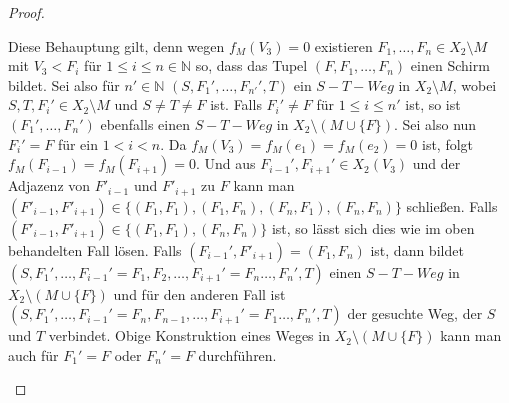 \documentclass[12pt,titlepage]{article}
\begin{document}
\begin{proof}
\begin{itemize}
 Diese Behauptung gilt, denn wegen $f_M(V_3)=0$ existieren $F_1,\ldots,F_n \in X_2\setminus M$ mit $V_3 <F_i$ für $1 \leq i \leq n \in \mathbb{N}$ so, dass das Tupel $(F,F_1,\ldots,F_n)$ einen Schirm bildet.
  Sei also für $n' \in \mathbb{N}$
   $(S,F_1',\ldots ,F_{n'}',T)$ ein $S-T-Weg$ in $X_2 \setminus M$, wobei $S,T,F_i' \in X_2\setminus M$ und $S\neq T \neq F$ ist. 
  Falls $F_i' \neq F$ für $1 \leq i \leq n'$ ist, so ist $(F_1',\ldots,F_n')$ ebenfalls einen $S-T-Weg$ in $X_2\setminus (M \cup \{F\})$.
   Sei also nun $F_i'=F$ für ein $1 < i < n$. Da $f_M(V_3)=f_M(e_1)=f_M(e_2)=0$ ist, folgt $f_M(F_{i-1})=f_M(F_{i+1})=0$. Und aus $F_{i-1}',F_{i+1}' \in X_2(V_3)$ und der Adjazenz von $F'_{i-1}$ und $F'_{i+1}$ zu $F$ kann man $(F'_{i-1},F'_{i+1}) \in \{(F_1,F_1),(F_1,F_n),(F_n,F_1),(F_n,F_n)\}$ schließen. Falls $(F'_{i-1},F'_{i+1}) \in \{(F_1,F_1),(F_n,F_n)\}$ ist, so lässt sich dies wie im oben behandelten Fall lösen. Falls $(F_{i-1}',F'_{i+1})=(F_1,F_n)$ ist, dann bildet $(S,F_1',\ldots,F_{i-1}'=F_1,F_2, \ldots,F_{i+1}'=F_n\ldots,F_n',T)$ einen $S-T-Weg$ in $X_2\setminus (M \cup \{F\})$ und für den anderen Fall ist $(S,F_1',\ldots,F_{i-1}'=F_n,F_{n-1}, \ldots,F_{i+1}'=F_1\ldots,F_n',T)$ der gesuchte Weg, der $S$ und $T$ verbindet. Obige Konstruktion eines Weges in $X_2 \setminus (M \cup \{F\})$ kann man auch für $F_1'=F$ oder $F_n'=F$ durchführen. 
   

\end{itemize}
\end{proof}
\end{document}
